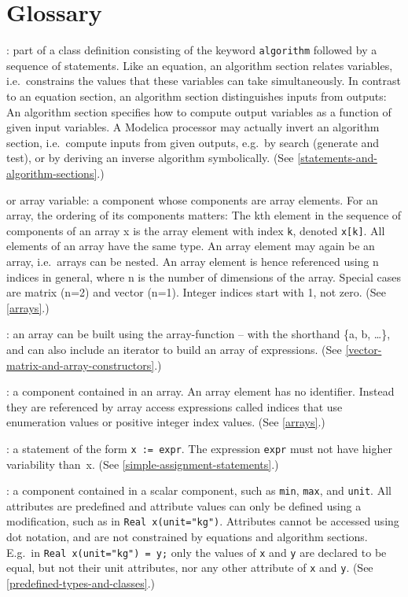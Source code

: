\chapter{Glossary}\label{glossary}
: part of a class definition consisting of the
keyword \lstinline!algorithm! followed by a sequence of statements. Like an
equation, an algorithm section relates variables, i.e.\ constrains the
values that these variables can take simultaneously. In contrast to an
equation section, an algorithm section distinguishes inputs from
outputs: An algorithm section specifies how to compute output variables
as a function of given input variables. A Modelica processor may
actually invert an algorithm section, i.e.\ compute inputs from given
outputs, e.g.\ by search (generate and test), or by deriving an inverse
algorithm symbolically. (See \cref{statements-and-algorithm-sections}.)

 or array variable: a component whose components are array
elements. For an array, the ordering of its components matters: The kth
element in the sequence of components of an array x is the array element
  with index \lstinline!k!, denoted \lstinline!x[k]!. All elements of an array have the same
  type. An array element may again be an array, i.e.\ arrays can be nested.
An array element is hence referenced using n indices in general, where n
is the number of dimensions of the array. Special cases are matrix (n=2)
and vector (n=1). Integer indices start with 1, not zero. (See \cref{arrays}.)

: an array can be built using the
array-function -- with the shorthand \{a, b, \ldots{}\}, and can also
include an iterator to build an array of expressions. (See \cref{vector-matrix-and-array-constructors}.)

: a component contained in an array. An array
element has no identifier. Instead they are referenced by array access
expressions called indices that use enumeration values or positive
integer index values. (See \cref{arrays}.)

: a statement of the form \lstinline!x := expr!. The expression
\lstinline!expr! must not have higher variability than~x. (See \cref{simple-assignment-statements}.)

: a component contained in a scalar component, such as
\lstinline!min!, \lstinline!max!, and \lstinline!unit!. All attributes are predefined and attribute values
can only be defined using a modification, such as in \lstinline!Real x(unit="kg")!.
Attributes cannot be accessed using dot notation, and are not
constrained by equations and algorithm sections. E.g.\ in \lstinline!Real x(unit="kg") = y;! only the values of \lstinline!x! and
\lstinline!y! are declared to be equal,
but not their unit attributes, nor any other attribute of \lstinline!x! and \lstinline!y!. (See
\cref{predefined-types-and-classes}.)

